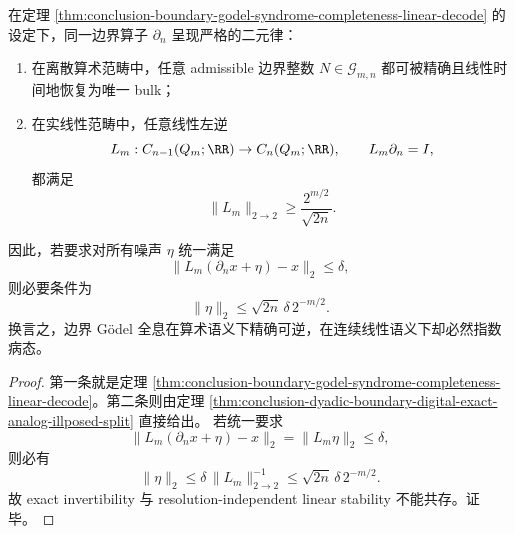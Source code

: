 

\begin{theorem}\label{thm:conclusion-boundary-godel-exactness-instability-bifurcation}
在定理 \ref{thm:conclusion-boundary-godel-syndrome-completeness-linear-decode} 的设定下，同一边界算子 \(\partial_n\) 呈现严格的二元律：
\begin{enumerate}
  \item 在离散算术范畴中，任意 admissible 边界整数 \(N\in\mathcal G_{m,n}\) 都可被精确且线性时间地恢复为唯一 bulk；
  \item 在实线性范畴中，任意线性左逆
  \[
  L_m:C_{n-1}(Q_m;\RR)\to C_n(Q_m;\RR),
  \qquad
  L_m\partial_n=I,
  \]
  都满足
  \[
  \|L_m\|_{2\to2}\ge \frac{2^{m/2}}{\sqrt{2n}}.
  \]
\end{enumerate}
因此，若要求对所有噪声 \(\eta\) 统一满足
\[
\|L_m(\partial_n x+\eta)-x\|_2\le \delta,
\]
则必要条件为
\[
\|\eta\|_2\le \sqrt{2n}\,\delta\,2^{-m/2}.
\]
换言之，边界 Gödel 全息在算术语义下精确可逆，在连续线性语义下却必然指数病态。
\end{theorem}
\begin{proof}
第一条就是定理 \ref{thm:conclusion-boundary-godel-syndrome-completeness-linear-decode}。第二条则由定理 \ref{thm:conclusion-dyadic-boundary-digital-exact-analog-illposed-split} 直接给出。
若统一要求
\[
\|L_m(\partial_n x+\eta)-x\|_2=\|L_m\eta\|_2\le \delta,
\]
则必有
\[
\|\eta\|_2\le \delta\,\|L_m\|_{2\to2}^{-1}
\le \sqrt{2n}\,\delta\,2^{-m/2}.
\]
故 exact invertibility 与 resolution-independent linear stability 不能共存。证毕。
\end{proof}

